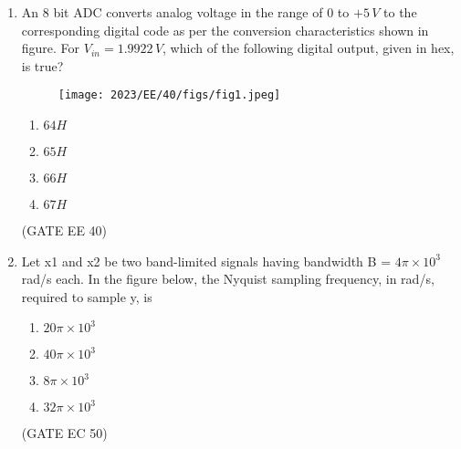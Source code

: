 \begin{enumerate}[label=\thechapter.\arabic*,ref=\thechapter.\theenumi]

\item An $8$ bit ADC converts analog voltage in the range of $0$ to $+5\, V$ to the corresponding digital code as per the conversion characteristics shown in figure. For $V_{in} = 1.9922\, V$, which of the following digital output, given in hex, is true?

\begin{figure}[!h]
    \centering
    \texttt{[image: 2023/EE/40/figs/fig1.jpeg]}
    \caption{}
    \label{fig:ADC_gate.ee.23.40}
\end{figure}
\begin{enumerate}[label=(\alph*)]
    \item $64H$
    \item $65H$
    \item $66H$
    \item $67H$
\end{enumerate} \hfill(GATE EE 40)

\solution

\newpage
\item Let x1 and x2 be two band-limited signals having bandwidth B = $4\pi\times10^3$
rad/s each. In the figure below, the Nyquist sampling frequency, in
rad/s, required to sample y, is \\

\begin{enumerate}[label=(\alph*)]
    \item $20\pi\times10^3$
    \item $40\pi\times10^3$
    \item $8\pi\times10^3$
    \item $32\pi\times10^3$
\end{enumerate} \hfill(GATE EC 50) \\
\solution
\newpage

\end{enumerate}
